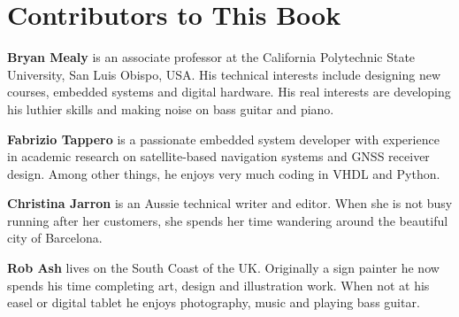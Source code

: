 %
%
%
\chapter{Contributors to This Book}

\noindent
\textbf{Bryan Mealy} is an associate professor at the California Polytechnic State University, San Luis Obispo, USA. His technical interests include designing new courses, embedded systems and digital hardware. His real interests are developing his luthier skills and making noise on bass guitar and piano.

\noindent
\textbf{Fabrizio Tappero} is a passionate embedded system developer with experience in academic research on satellite-based navigation systems and GNSS receiver design. Among other things, he enjoys very much coding in VHDL and Python.

\noindent
\textbf{Christina Jarron} is an Aussie technical writer and editor. When she is not busy running after her customers, she spends her time wandering around the beautiful city of Barcelona. 

\noindent
\textbf{Rob Ash} lives on the South Coast of the UK. Originally a sign painter he now spends his time completing art, design and illustration work. When not at his easel or digital tablet he enjoys photography, music and playing bass guitar.


